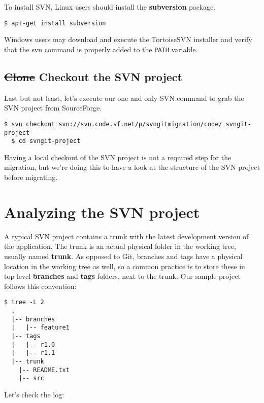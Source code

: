 \documentclass{../common/tufte-latex/tufte-handout}
\begin{document}
To install SVN, Linux users should install the \textbf{subversion} package.

\begin{lstlisting}[style=BashInputStyle]
  $ apt-get install subversion
\end{lstlisting}

Windows users may download and execute the TortoiseSVN installer and verify that the svn command is properly added to the \texttt{PATH} variable.

\subsection{\st{Clone} Checkout the SVN project}

Last but not least, let's execute our one and only SVN command to grab the SVN project from SourceForge.

\begin{lstlisting}[style=BashInputStyle]
  $ svn checkout svn://svn.code.sf.net/p/svngitmigration/code/ svngit-project
  $ cd svngit-project
\end{lstlisting}

Having a local checkout of the SVN project is not a required step for the migration, but we're doing this to have a look at the structure of the SVN project before migrating.

\section{Analyzing the SVN project}

A typical SVN project contains a trunk with the latest development version of the application.
The trunk is an actual physical folder in the working tree, usually named \textbf{trunk}.
As opposed to Git, branches and tags have a physical location in the working tree as well, so a common practice is to store these in top-level \textbf{branches} and \textbf{tags} folders, next to the trunk.
Our sample project follows this convention:

\begin{lstlisting}[style=BashInputStyle]
  $ tree -L 2
  .
  |-- branches
  |   |-- feature1
  |-- tags
  |   |-- r1.0
  |   |-- r1.1
  |-- trunk
    |-- README.txt
    |-- src

\end{lstlisting}

Let's check the log:
\end{document}
